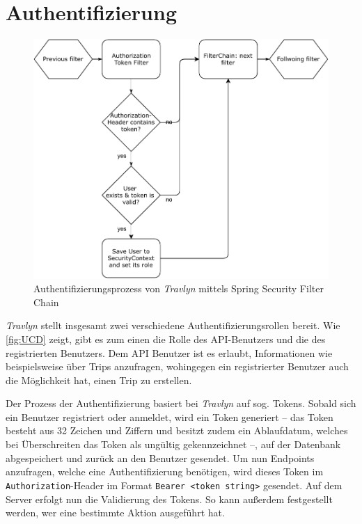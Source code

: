 	\section{Authentifizierung}
	
		\begin{figure}[ht!]
			\centering
			\includegraphics[width=1\textwidth]{images/authorization-flow-chart.pdf}
			\caption{Authentifizierungsprozess von \textit{Travlyn} mittels Spring Security Filter Chain}
			\label{fig:authenticationProcess}
		\end{figure} 
		
		\textit{Travlyn} stellt insgesamt zwei verschiedene Authentifizierungsrollen bereit. Wie \autoref{fig:UCD} zeigt, gibt es zum einen die Rolle des \acs{API}-Benutzers und die des registrierten Benutzers. Dem API Benutzer ist es erlaubt, Informationen wie beispielsweise über Trips anzufragen, wohingegen ein registrierter Benutzer auch die Möglichkeit hat, einen Trip zu erstellen. 
		
		Der Prozess der Authentifizierung basiert bei \textit{Travlyn} auf sog. Tokens. Sobald sich ein Benutzer registriert oder anmeldet, wird ein Token generiert -- das Token besteht aus 32 Zeichen und Ziffern und besitzt zudem ein Ablaufdatum, welches bei Überschreiten das Token als ungültig gekennzeichnet --, auf der Datenbank abgespeichert und zurück an den Benutzer gesendet. Um nun Endpoints anzufragen, welche eine Authentifizierung benötigen, wird dieses Token im \lstinline|Authorization|-Header im Format \lstinline|Bearer <token string>| gesendet. Auf dem Server erfolgt nun die Validierung des Tokens. So kann außerdem festgestellt werden, wer eine bestimmte Aktion ausgeführt hat. 
		
